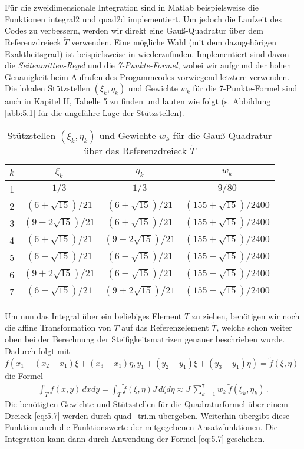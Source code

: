 Für die zweidimensionale Integration sind in Matlab beispielsweise die Funktionen {\ttfamily integral2} und {\ttfamily quad2d} implementiert. Um jedoch die Laufzeit des Codes zu verbessern, werden wir direkt eine Gauß-Quadratur über dem Referenzdreieck $\widetilde T$ verwenden. Eine mögliche Wahl (mit dem dazugehörigen Exaktheitsgrad) ist beispielsweise in \cite{Quad} wiederzufinden. Implementiert sind davon die \textit{Seitenmitten-Regel} und die \textit{7-Punkte-Formel}, wobei wir aufgrund der hohen Genauigkeit beim Aufrufen des Progammcodes vorwiegend letztere verwenden. Die lokalen Stützstellen $(\xi_k,\eta_k)$ und Gewichte $w_k$ für die 7-Punkte-Formel sind auch in \cite{BraeFEM} Kapitel II, Tabelle 5 zu finden und lauten wie folgt (s. Abbildung \ref{abb:5.1} für die ungefähre Lage der Stützstellen).

\begin{table}[htpb]
\centering
\begin{tabular}[c]{|c|c|c|c|}
	\hline
	$k$ & $\xi_k$ & $\eta_k$ & $w_k$ \\
	\hline
	 1 & $1/3$ & $1/3$ & $9/80$ \\
	 2 & $(6+\sqrt{15})/21$ & $(6+\sqrt{15})/21$ & $(155+\sqrt{15})/2400$ \\
	 3 & $(9-2\sqrt{15})/21$ & $(6+\sqrt{15})/21$ & $(155+\sqrt{15})/2400$  \\
	 4 & $(6+\sqrt{15})/21$ & $(9-2\sqrt{15})/21$ & $(155+\sqrt{15})/2400$ \\
	 5 & $(6-\sqrt{15})/21$ & $(6-\sqrt{15})/21$ & $(155-\sqrt{15})/2400$ \\
	 6 & $(9+2\sqrt{15})/21$ & $(6-\sqrt{15})/21$ & $(155-\sqrt{15})/2400$ \\
	 7 & $(6-\sqrt{15})/21$ & $(9+2\sqrt{15})/21$ & $(155-\sqrt{15})/2400$ \\
	\hline
\end{tabular}
\caption{\label{tab:5.1}Stützstellen $(\xi_k,\eta_k)$ und Gewichte $w_k$ für die Gauß-Quadratur über das Referenzdreieck $\widetilde T$}
\end{table}

Um nun das Integral über ein beliebiges Element $T$ zu ziehen, benötigen wir noch die affine Transformation von $T$ auf das Referenzelement $\widetilde T$, welche schon weiter oben bei der Berechnung der Steifigkeitsmatrizen genauer beschrieben wurde. Dadurch folgt  mit $f(x_1+(x_2-x_1)\xi+(x_3-x_1)\eta,y_1+(y_2-y_1)\xi + (y_3-y_1)\eta) = \tilde f(\xi,\eta)$ die Formel
\begin{align}\label{eq:5.7}
	\int_T f(x,y) \, dxdy = \int_{\widetilde T} \tilde f(\xi,\eta)  J \, d\xi d\eta  \approx J\,  \sum_{k=1}^7 w_k \, \tilde f(\xi_k,\eta_k) \, .
\end{align}
Die benötigten Gewichte und Stützstellen für die Quadraturformel über einem Dreieck \eqref{eq:5.7}  werden durch {\ttfamily quad_tri.m} übergeben. Weiterhin übergibt diese Funktion auch die Funktionswerte der mitgegebenen Ansatzfunktionen. Die Integration kann dann durch Anwendung der Formel \eqref{eq:5.7} geschehen.


